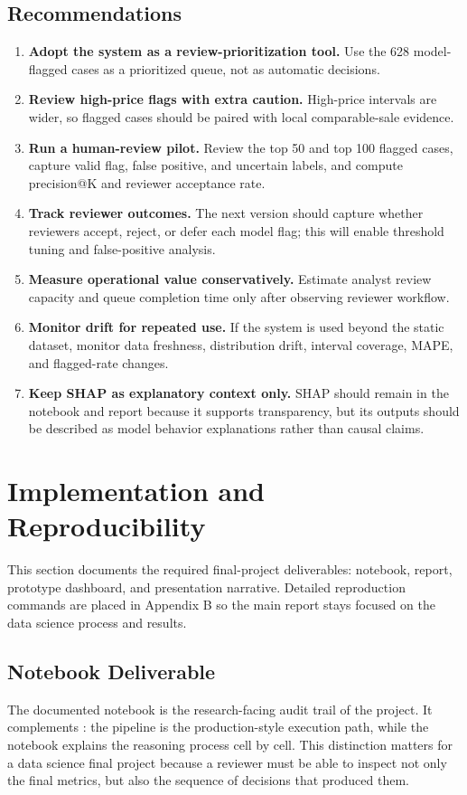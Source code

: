 \documentclass[12pt,a4paper]{article}
\begin{document}
\subsection{Recommendations}
\begin{enumerate}
    \item \textbf{Adopt the system as a review-prioritization tool.} Use the 628 model-flagged cases as a prioritized queue, not as automatic decisions.
    \item \textbf{Review high-price flags with extra caution.} High-price intervals are wider, so flagged cases should be paired with local comparable-sale evidence.
    \item \textbf{Run a human-review pilot.} Review the top 50 and top 100 flagged cases, capture valid flag, false positive, and uncertain labels, and compute precision@K and reviewer acceptance rate.
    \item \textbf{Track reviewer outcomes.} The next version should capture whether reviewers accept, reject, or defer each model flag; this will enable threshold tuning and false-positive analysis.
    \item \textbf{Measure operational value conservatively.} Estimate analyst review capacity and queue completion time only after observing reviewer workflow.
    \item \textbf{Monitor drift for repeated use.} If the system is used beyond the static dataset, monitor data freshness, distribution drift, interval coverage, MAPE, and flagged-rate changes.
    \item \textbf{Keep SHAP as explanatory context only.} SHAP should remain in the notebook and report because it supports transparency, but its outputs should be described as model behavior explanations rather than causal claims.
\end{enumerate}

\section{Implementation and Reproducibility}

This section documents the required final-project deliverables: notebook, report, prototype dashboard, and presentation narrative. Detailed reproduction commands are placed in Appendix B so the main report stays focused on the data science process and results.

\subsection{Notebook Deliverable}
The documented notebook  is the research-facing audit trail of the project. It complements : the pipeline is the production-style execution path, while the notebook explains the reasoning process cell by cell. This distinction matters for a data science final project because a reviewer must be able to inspect not only the final metrics, but also the sequence of decisions that produced them.
\end{document}
